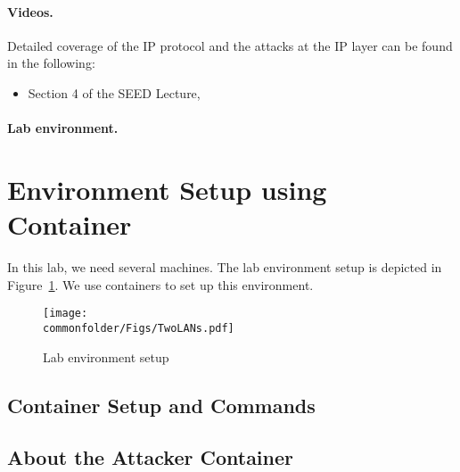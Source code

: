\paragraph{Videos.}
Detailed coverage of the IP protocol and the attacks at the IP layer can be found 
in the following:

\begin{itemize}
\item Section 4 of the SEED Lecture, \seedisvideo
\end{itemize}


\paragraph{Lab environment.} \seedenvironmentC



\section{Environment Setup using Container}

In this lab, we need several machines. The lab
environment setup is depicted in Figure~\ref{ip:fig:labsetup}.
We use containers to set up this environment.


\begin{figure}[htb]
\begin{center}
\texttt{[image: \\commonfolder/Figs/TwoLANs.pdf]}
\end{center}
\caption{Lab environment setup}
\label{ip:fig:labsetup}
\end{figure}



\subsection{Container Setup and Commands}




\subsection{About the Attacker Container}

